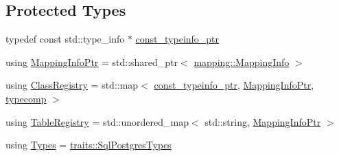 \subsection*{Protected Types}
\begin{DoxyCompactItemize}
\item 
typedef const std\+::type\+\_\+info $\ast$ \hyperlink{classdbo_1_1connection_ad9b28dcf5699796d552af8a159f03a5a}{const\+\_\+typeinfo\+\_\+ptr}
\item 
using \hyperlink{classdbo_1_1connection_acca03a784c87ffb1ec7bdf33f526dff5}{Mapping\+Info\+Ptr} = std\+::shared\+\_\+ptr$<$ \hyperlink{classdbo_1_1mapping_1_1_mapping_info}{mapping\+::\+Mapping\+Info} $>$
\item 
using \hyperlink{classdbo_1_1connection_adecb3694055470fb13f96185f3804e4e}{Class\+Registry} = std\+::map$<$ \hyperlink{classdbo_1_1connection_ad9b28dcf5699796d552af8a159f03a5a}{const\+\_\+typeinfo\+\_\+ptr}, \hyperlink{classdbo_1_1connection_acca03a784c87ffb1ec7bdf33f526dff5}{Mapping\+Info\+Ptr}, \hyperlink{structdbo_1_1connection_1_1typecomp}{typecomp} $>$
\item 
using \hyperlink{classdbo_1_1connection_ac58484f4b88dbc57cbd1f63471aa456d}{Table\+Registry} = std\+::unordered\+\_\+map$<$ std\+::string, \hyperlink{classdbo_1_1connection_acca03a784c87ffb1ec7bdf33f526dff5}{Mapping\+Info\+Ptr} $>$
\item 
using \hyperlink{classdbo_1_1connection_a14300ab905d89431e1410f657c10f217}{Types} = \hyperlink{classdbo_1_1traits_1_1_sql_postgres_types}{traits\+::\+Sql\+Postgres\+Types}
\end{DoxyCompactItemize}
